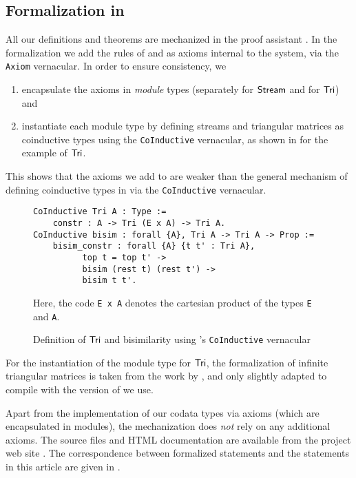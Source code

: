 \documentclass[a4paper,USenglish]{lipics}
\begin{document}
\begin{Long}
\section{Formalization in \coq}\label{sec:formal}

All our definitions and theorems are mechanized in the proof assistant \coq \parencite{coq84pl4}.
In the formalization we add the rules of  and  as axioms internal to the \coq system, via the \lstinline!Axiom! vernacular. In order to ensure consistency, we 
\begin{enumerate}
 \item encapsulate the axioms in \coq \emph{module} types (separately for $\mathsf{Stream}$ and for $\mathsf{Tri}$) and
 \item instantiate each module type by defining streams and triangular matrices as coinductive types using the \lstinline!CoInductive! vernacular,
  as shown in  for the example of $\mathsf{Tri}$.
\end{enumerate}
This shows that the axioms we add to \coq are weaker than the general mechanism of defining coinductive types in \coq via the \lstinline!CoInductive! vernacular.

\begin{figure}
 \begin{mdframed}
  \begin{lstlisting}
CoInductive Tri A : Type :=
    constr : A -> Tri (E x A) -> Tri A.
CoInductive bisim : forall {A}, Tri A -> Tri A -> Prop :=
    bisim_constr : forall {A} {t t' : Tri A}, 
          top t = top t' -> 
          bisim (rest t) (rest t') -> 
          bisim t t'.
\end{lstlisting}
Here, the code \lstinline!E x A! denotes the cartesian product of the types \lstinline!E! and \lstinline!A!.
 \end{mdframed}
 \caption{Definition of $\mathsf{Tri}$ and bisimilarity using \coq's \lstinline!CoInductive! vernacular} \label{tri_coinductive}
\end{figure}


For the instantiation of the module type for $\mathsf{Tri}$, the formalization of infinite triangular matrices is taken from the work by \textcite{DBLP:conf/types/MatthesP11},
and only slightly adapted to compile with the version of \coq we use.

Apart from the implementation of our codata types via axioms (which are encapsulated in modules), the mechanization does \emph{not} rely on any additional axioms.
The \coq source files and HTML documentation are available from the project web site \parencite{trimat_coq}.
The correspondence between formalized statements and the statements in this article are given in .




\end{Long}
\end{document}
